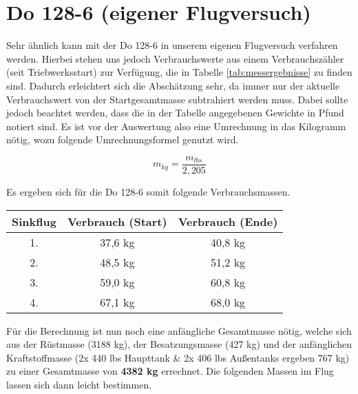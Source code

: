 \vspace{10mm}
\section{Do 128-6 (eigener Flugversuch)}
Sehr ähnlich kann mit der Do 128-6 in unserem eigenen Flugversuch verfahren werden. Hierbei stehen uns jedoch Verbrauchswerte aus einem Verbrauchszähler (seit Triebwerksstart) zur Verfügung, die in Tabelle \ref{tab:messergebnisse} zu finden sind. Dadurch erleichtert sich die Abschätzung sehr, da immer nur der aktuelle Verbrauchswert von der Startgesamtmasse subtrahiert werden muss. Dabei sollte jedoch beachtet werden, dass die in der Tabelle angegebenen Gewichte in Pfund notiert sind. Es ist vor der Auswertung also eine Umrechnung in das Kilogramm nötig, wozu folgende Umrechnungsformel genutzt wird.


\begin{equation}
m_{kg} = \frac{m_{lbs}}{2,205}
\end{equation}

\vspace{5mm}
Es ergeben sich für die Do 128-6 somit folgende Verbrauchsmassen.

\begin{table}[h]
	\centering
	\begin{tabular}{|c|c|c|}
		\hline
		\textbf{Sinkflug}} & \textbf{Verbrauch (Start)} & \textbf{Verbrauch (Ende)} \\ \hline
		1. & 37,6 kg                                        & 40,8 kg                                       \\ \hline
		2. & 48,5 kg                                        & 51,2 kg                                       \\ \hline
		3. & 59,0 kg                                        & 60,8 kg                                       \\ \hline
		4. & 67,1 kg                                        & 68,0 kg                                       \\ \hline
	\end{tabular}
\end{table}

\vspace{10mm}
\noindent Für die Berechnung ist nun noch eine anfängliche Gesamtmasse nötig, welche sich aus der Rüstmasse (3188 kg), der Besatzungsmasse (427 kg) und der anfänglichen Kraftstoffmasse (2x 440 lbs Haupttank \& 2x 406 lbs Außentanks ergeben 767 kg) zu einer Gesamtmasse von \textbf{4382 kg} errechnet. Die folgenden Massen im Flug lassen sich dann leicht bestimmen.\\

